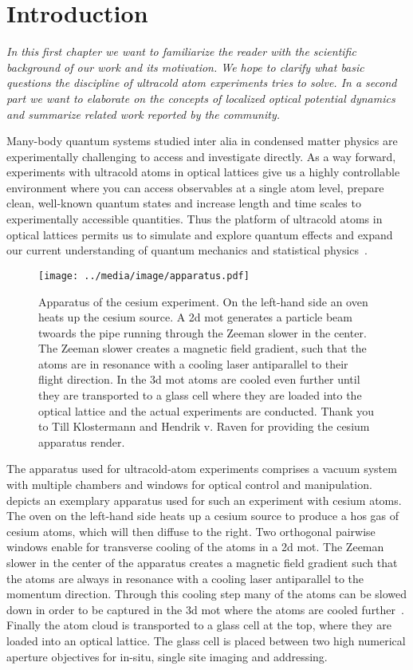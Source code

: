\chapter{Introduction}

\textit{In this first chapter we want to familiarize the reader with the
scientific background of our work and its motivation. We hope to clarify what
basic questions the discipline of ultracold atom experiments tries to solve.
In a second part we want to elaborate on the concepts of localized optical
potential dynamics and summarize related work reported by the community.}

Many-body quantum systems studied inter alia in condensed matter physics are
experimentally challenging to access and investigate directly. As a way
forward, experiments with ultracold atoms in optical lattices give us a highly
controllable environment where you can access observables at a single atom
level, prepare clean, well-known quantum states and increase length and time
scales to experimentally accessible quantities. Thus the platform of ultracold
atoms in optical lattices permits us to simulate and explore quantum effects
and expand our current understanding of quantum mechanics and statistical
physics~\cite{Bloch2008,Gross2017}.
\begin{figure}[htb]
  \centering
  \texttt{[image: ../media/image/apparatus.pdf]}
  \caption{Apparatus of the cesium experiment. On the left-hand
    side an oven heats up the cesium source. A \gls{2d} \gls{mot} generates a
    particle beam twoards the pipe running through the Zeeman slower in the
    center. The Zeeman slower creates a magnetic field gradient, such that the
    atoms are in resonance with a cooling laser antiparallel to their flight
    direction. In the \gls{3d} \gls{mot} atoms are cooled even further until
    they are transported to a glass cell where they are loaded into the
    optical lattice and the actual experiments are conducted. Thank you to
    Till Klostermann and Hendrik v. Raven for providing the cesium apparatus
    render.}\label{fig:ultracold_atoms_setup}
\end{figure}
The apparatus used for ultracold-atom experiments comprises a vacuum system
with multiple chambers and windows for optical control and manipulation.
 depicts an exemplary apparatus used
for such an experiment with cesium atoms. The oven on the left-hand side heats
up a cesium source to produce a hos gas of cesium atoms, which will then
diffuse to the right. Two orthogonal pairwise windows enable for transverse
cooling of the atoms in a \gls{2d} \gls{mot}. The Zeeman slower in the center
of the apparatus creates a magnetic field gradient such that the atoms are
always in resonance with a cooling laser antiparallel to the momentum
direction. Through this cooling step many of the atoms can be slowed down in
order to be captured in the \gls{3d} \gls{mot} where the atoms are cooled
further~\cite{Phillips1998}. Finally the atom cloud is transported to a glass
cell at the top, where they are loaded into an optical lattice. The glass
cell is placed between two high numerical aperture objectives for in-situ,
single site imaging and addressing.

